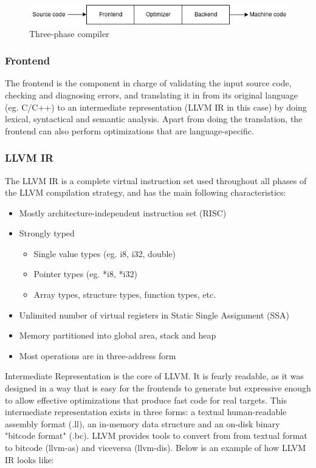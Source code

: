 \documentclass[12pt,a4paper,oneside]{article}
\begin{document}
\begin{figure}[H]
\centering
  \includegraphics[scale=0.8]{img/three_phase.png}
  \caption{Three-phase compiler}
  \label{fig:three_phase}
\end{figure}

\subsubsection{Frontend}

The frontend is the component in charge of validating the input source code,
checking and diagnosing errors, and translating it in from its original language
(eg. C/C++) to an intermediate representation (LLVM IR in this case) by doing
lexical, syntactical and semantic analysis. Apart from doing the translation,
the frontend can also perform optimizations that are language-specific.

\subsubsection{LLVM IR}

The LLVM IR is a complete virtual instruction set used throughout all phases
of the LLVM compilation strategy, and has the main following characteristics:
\begin{itemize}
  \item Mostly architecture-independent instruction set (RISC)
  \item Strongly typed
  \begin{itemize}
    \item Single value types (eg. i8, i32, double)
    \item Pointer types (eg. *i8, *i32)
    \item Array types, structure types, function types, etc.
  \end{itemize}
  \item Unlimited number of virtual registers in Static Single Assignment (SSA)
  \item Memory partitioned into global area, stack and heap
  \item Most operations are in three-address form
\end{itemize}
Intermediate Representation is the core of LLVM. It is fearly readable, as
it was designed in a way that is easy for the frontends to generate but
expressive enough to allow effective optimizations that produce fast code for
real targets. This intermediate representation exists in three forms: a textual
human-readable assembly format (.ll), an in-memory data structure and an on-disk
binary "bitcode format" (.bc). LLVM provides tools to convert from from textual
format to bitcode (llvm-as) and viceversa (llvm-dis). Below is an example of how
LLVM IR looks like:\\
\end{document}
